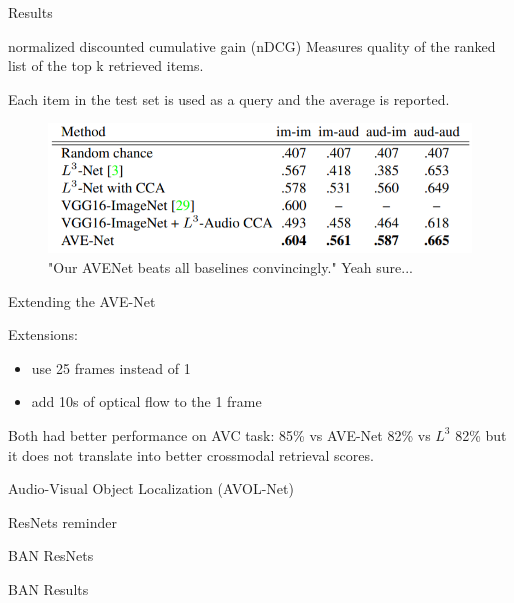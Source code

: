 \documentclass{beamer}
\begin{document}
\begin{frame}{Results}
\begin{block}{normalized discounted cumulative gain (nDCG)}
Measures quality of the ranked list of the top k retrieved items.
\end{block}

Each item in the test set is used as a query and the average  is reported.

\begin{figure}[h]
\includegraphics[width=\textwidth]{img/results}
\caption{"Our AVENet
beats all baselines convincingly." \cite{cit:ots} Yeah sure...}
\end{figure}

\end{frame}
\begin{frame}{Extending the AVE-Net}

Extensions:
\begin{itemize}
\item use 25 frames instead of 1
\item add 10s of optical flow to the 1 frame
\end{itemize}

\vfill

Both had better performance on AVC task: 85\% vs AVE-Net 82\% vs $L^3$ 82\% but it does not translate into better crossmodal retrieval scores.

\end{frame}
\begin{frame}{Audio-Visual Object Localization (AVOL-Net)}



\end{frame}
\begin{frame}{ResNets reminder}

\end{frame}
\begin{frame}{BAN ResNets}

\end{frame}
\begin{frame}{BAN Results}


\end{frame}
\end{document}
